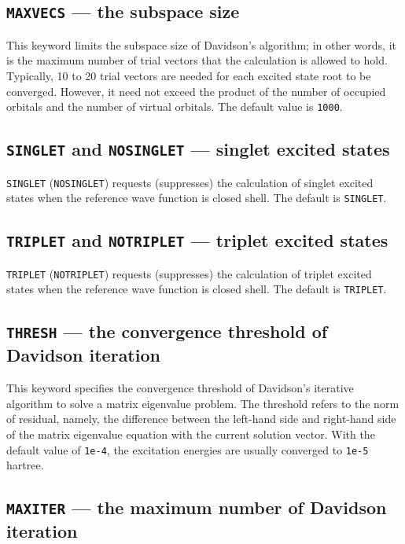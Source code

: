 \subsection{{\tt MAXVECS} --- the subspace size}

This keyword limits the subspace size of Davidson's algorithm; in other words, it
is the maximum number of trial vectors that the calculation is allowed to hold.
Typically, 10 to 20 trial vectors are needed for each excited state root to be
converged.  However, it need not exceed the product of the number of occupied 
orbitals and the number of virtual orbitals.  The default value is \verb+1000+.

\subsection{{\tt SINGLET} and {\tt NOSINGLET} --- singlet excited states}

\verb+SINGLET+ (\verb+NOSINGLET+) requests (suppresses) the calculation of singlet 
excited states when the reference wave function is closed shell.  The default 
is \verb+SINGLET+.

\subsection{{\tt TRIPLET} and {\tt NOTRIPLET} --- triplet excited states}

\verb+TRIPLET+ (\verb+NOTRIPLET+) requests (suppresses) the calculation of triplet 
excited states when the reference wave function is closed shell.  The default 
is \verb+TRIPLET+.

\subsection{{\tt THRESH} --- the convergence threshold of Davidson iteration}

This keyword specifies the convergence threshold of Davidson's iterative algorithm
to solve a matrix eigenvalue problem.  The threshold refers to the norm of residual,
namely, the difference between the left-hand side and right-hand side of the matrix
eigenvalue equation with the current solution vector.  With the default value of 
\verb+1e-4+, the excitation energies are usually converged to \verb+1e-5+ hartree.

\subsection{{\tt MAXITER} --- the maximum number of Davidson iteration}

